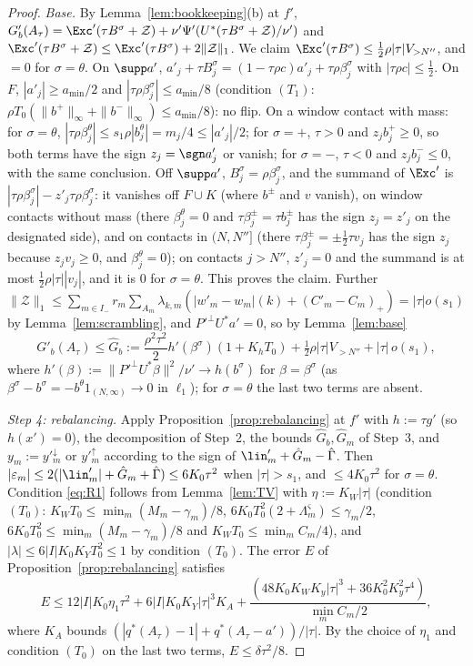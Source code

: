 \begin{proof}
\emph{Base.}  By Lemma~\ref{lem:bookkeeping}(b) at $f'$,
$G'_b(A_\tau)=\Exc'(\tau B^\sigma+\mathcal Z)+\nu'\Psi'(U^*(\tau B^\sigma+
\mathcal Z)/\nu')$ and $\Exc'(\tau B^\sigma+\mathcal Z)\le\Exc'(\tau B^\sigma)
+2\|\mathcal Z\|_1$.  We claim $\Exc'(\tau B^\sigma)\le\frac12\rho|\tau|
V_{>N''}$, and $=0$ for $\sigma=\theta$.  On $\supp a'$,
$a'_j+\tau B^\sigma_j=(1-\tau\rho c)a'_j+\tau\rho\beta^\sigma_j$ with
$|\tau\rho c|\le\frac12$.  On $F$, $|a'_j|\ge a_{\min}/2$ and
$|\tau\rho\beta^\sigma_j|\le a_{\min}/8$ (condition $(T_1)$: $\rho T_0
(\|b^+\|_\infty+\|b^-\|_\infty)\le a_{\min}/8$): no flip.  On a window
contact with mass: for $\sigma=\theta$, $|\tau\rho\beta^\theta_j|\le
s_1\rho|b^\theta_j|=m_j/4\le|a'_j|/2$; for $\sigma=+$, $\tau>0$ and
$z_jb^+_j\ge0$, so both terms have the sign $z_j=\sgn a'_j$ or vanish; for
$\sigma=-$, $\tau<0$ and $z_jb^-_j\le0$, with the same conclusion.  Off
$\supp a'$, $B^\sigma_j=\rho\beta^\sigma_j$, and the summand of $\Exc'$ is
$|\tau\rho\beta^\sigma_j|-z'_j\tau\rho\beta^\sigma_j$: it vanishes off
$F\cup K$ (where $b^\pm$ and $v$ vanish), on window contacts without mass
(there $\beta^\theta_j=0$ and $\tau\beta^\pm_j=\tau b^\pm_j$ has the sign
$z_j=z'_j$ on the designated side), and on contacts in $(N,N'']$ (there
$\tau\beta^\pm_j=\pm\frac12\tau v_j$ has the sign $z_j$ because $z_jv_j\ge0$,
and $\beta^\theta_j=0$); on contacts $j>N''$, $z'_j=0$ and the summand is at
most $\frac12\rho|\tau||v_j|$, and it is $0$ for $\sigma=\theta$.  This proves
the claim.  Further $\|\mathcal Z\|_1\le\sum_{m\in I_-}r_m\sum_{A_m}
\lambda_{k,m}(|w'_m-w_m|(k)+(C'_m-C_m)_+)=|\tau|o(s_1)$ by
Lemma~\ref{lem:scrambling}, and $P'^\perp U^*a'=0$, so by
Lemma~\ref{lem:base}
\[
 G'_b(A_\tau)\le\hat G_b:=\frac{\rho^2\tau^2}2h'(\beta^\sigma)(1+K_hT_0)
 +\tfrac12\rho|\tau|V_{>N''}+|\tau|\,o(s_1),
\]
where $h'(\beta):=\|P'^\perp U^*\beta\|^2/\nu'\to h(b^\sigma)$ for
$\beta=\beta^\sigma$ (as $\beta^\sigma-b^\sigma=-b^\theta1_{(N,\infty)}\to0$
in $\ell_1$); for $\sigma=\theta$ the last two terms are absent.

\emph{Step 4: rebalancing.}  Apply Proposition~\ref{prop:rebalancing} at
$f'$ with $h:=\tau g'$ (so $h(x')=0$), the decomposition of Step~2, the
bounds $\hat G_b,\hat G_m$ of Step~3, and $y_m:=y'^\downarrow_m$ or
$y'^\uparrow_m$ according to the sign of $\lin'_m+\hat G_m-\hat\Gamma$.
Then $|\varepsilon_m|\le2(|\lin'_m|+\hat G_m+\hat\Gamma)\le6K_0\tau^2$ when
$|\tau|>s_1$, and $\le4K_0\tau^2$ for $\sigma=\theta$.  Condition
\eqref{eq:R1} follows from Lemma~\ref{lem:TV} with $\eta:=K_W|\tau|$
(condition $(T_0)$: $K_WT_0\le\min_m(M_m-\gamma_m)/8$, $6K_0T_0^2(2+
\Lambda^\varsigma_m)\le\gamma_m/2$, $6K_0T_0^2\le\min_m(M_m-\gamma_m)/8$ and
$K_WT_0\le\min_mC_m/4$), and $|\lambda|\le6|I|K_0K_YT_0^2\le1$ by
condition $(T_0)$.  The error $E$ of Proposition~\ref{prop:rebalancing}
satisfies
\[
 E\le12|I|K_0\eta_1\tau^2+6|I|K_0K_Y|\tau|^3K_A+\frac{(48K_0K_WK_y|\tau|^3
 +36K_0^2K_y^2\tau^4)}{\min_mC_m/2},
\]
where $K_A$ bounds $(|q^*(A_\tau)-1|+q^*(A_\tau-a'))/|\tau|$.  By the choice
of $\eta_1$ and condition $(T_0)$ on the last two terms, $E\le\delta\tau^2/8$.


\end{proof}
